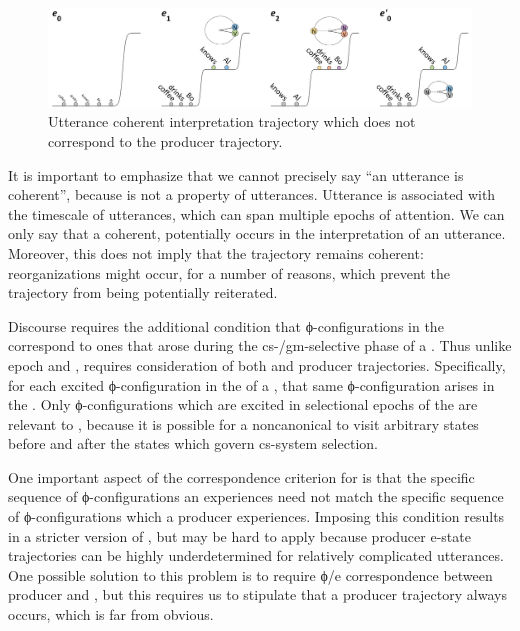   
\begin{figure}
\includegraphics[width=\textwidth]{figures/Tilsen-img126.png}
\caption{Utterance coherent interpretation trajectory which does not correspond to the producer trajectory.}
\label{fig:6:7}
\end{figure}
 

  It is important to emphasize that we cannot precisely say “an utterance is coherent”, because  is not a property of utterances. Utterance  is  associated with the timescale of utterances, which can span multiple epochs of attention. We can only say that a coherent, potentially  occurs in the interpretation of an utterance. Moreover, this does not imply that the trajectory remains coherent: reorganizations might occur, for a number of reasons, which prevent the trajectory from being potentially reiterated.

  Discourse  requires the additional condition that ϕ-con\-fi\-gu\-ra\-tions in the   correspond to ones that arose during the cs-/gm-selective phase of a . Thus unlike epoch and ,  requires consideration of both  and producer trajectories. Specifically, for each excited ϕ-con\-fi\-gu\-ra\-tion in the  of a , that same ϕ-con\-fi\-gu\-ra\-tion arises in the . Only ϕ-con\-fi\-gu\-ra\-tions which are excited in selectional epochs of the  are relevant to , because it is possible for a noncanonical  to visit arbitrary states before and after the states which govern cs-sys\-tem selection. 

  One important aspect of the correspondence criterion for  is that the specific sequence of ϕ-con\-fi\-gu\-ra\-tions an  experiences need not match the specific sequence of ϕ-con\-fi\-gu\-ra\-tions which a producer experiences. Imposing this condition results in a stricter version of , but may be hard to apply because producer e-state trajectories can be highly underdetermined for relatively complicated utterances. One possible solution to this problem is to require ϕ/e  correspondence between producer and , but this requires us to stipulate that a  producer trajectory always occurs, which is far from obvious.

